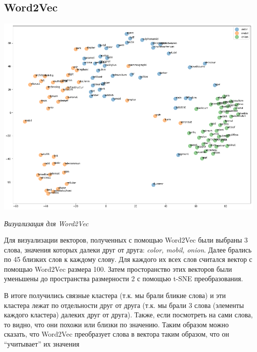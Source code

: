 \documentclass[12pt, a4paper]{article}
\begin{document}
        \subsection{Word2Vec}
            \begin{singlespace}
                \begin{center}
                    \includegraphics[width=17cm]{w2v.png}

                    \textit{Визуализация для Word2Vec}
                \end{center}
            \end{singlespace}

            Для визуализации векторов, полученных с помощью Word2Vec были выбраны 3 слова, значения которых далеки друг от друга: \textit{color, mobil, onion}. Далее брались по 45 близких слов к каждому слову. Для каждого их всех слов считался вектор с помощью Word2Vec размера 100. Затем просторанство этих векторов были уменьшены до пространства размерности 2 с помощью t-SNE преобразования.

            В итоге получились связные кластера (т.к. мы брали бликие слова) и эти кластера лежат по отдельности друг от друга (т.к. мы брали 3 слова (элементы каждого кластера) далеких друг от друга). Также, если посмотреть на сами слова, то видно, что они похожи или близки по значению. Таким образом можно сказать, что Word2Vec преобразует слова в вектора таким образом, что он ``учитывает'' их значения
\end{document}
